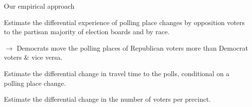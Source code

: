\documentclass[xcolor=dvipsnames, 11pt, table]{beamer}
\begin{document}









\begin{frame}{Our empirical approach}

		\pause
		Estimate the \alert{differential} experience of polling place changes by \alert{opposition voters} to the partisan majority of election boards \pause and by \alert{race}.

		\footnotesize \vspace*{.05in}
		$\longrightarrow$ Democrats move the polling places of Republican voters more than Democrat voters \& vice versa.

		\pause
		\vspace{.25in}
		Estimate the differential change in travel time to the polls, conditional on a polling place change.

		\pause
		\vspace{.25in}
		Estimate the differential change in the number of voters per precinct.

\end{frame}
\end{document}
